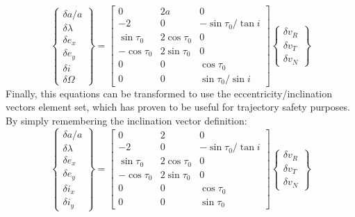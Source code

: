 		\begin{equation}
		\left\{\begin{array}{c}
		\delta a / a\\
		\delta \lambda \\
		\delta e_x \\
		\delta e_y \\
		\delta i \\
		\delta \Omega 
		\end{array}\right\} =\left[\begin{array}{cccc}
		0 & 2 a & 0 \\
		-2 & 0 & -\sin \tau_0 / \tan i \\
		\sin \tau_0 & 2 \cos \tau_0 & 0 \\
		-\cos \tau_0 & 2 \sin \tau_0 & 0 \\
		0 & 0 & \cos \tau_0 \\
		0 & 0 & \sin \tau_0 / \sin i
		\end{array}\right] \left\{\begin{array}{c}
		\delta v_R \\
		\delta v_T \\
		\delta v_N
		\end{array}\right\}
		\end{equation}
		\indent Finally, this equations can be transformed to use the eccentricity/inclination vectors element set, which has proven to be useful for trajectory safety purposes. By simply remembering the inclination vector definition:
		\begin{equation}
		\left\{\begin{array}{c}
		\delta a / a\\
		\delta \lambda \\
		\delta e_x \\
		\delta e_y \\
		\delta i_x \\
		\delta i_y 
		\end{array}\right\} =\left[\begin{array}{cccc}
		0 & 2 & 0 \\
		-2 & 0 & -\sin \tau_0 / \tan i \\
		\sin \tau_0 & 2 \cos \tau_0 & 0 \\
		-\cos \tau_0 & 2 \sin \tau_0 & 0 \\
		0 & 0 & \cos \tau_0 \\
		0 & 0 & \sin \tau_0
		\end{array}\right] \left\{\begin{array}{c}
		\delta v_R \\
		\delta v_T \\
		\delta v_N
		\end{array}\right\}
		\label{eqCh5:ICs_V1}
		\end{equation}
